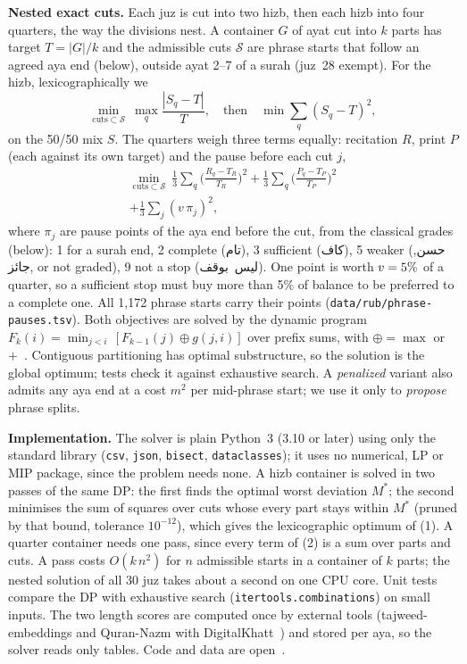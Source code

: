 \documentclass[conference]{IEEEtran}
\newcommand{\ar}[1]{\mbox{\textarabic{#1}}}
\begin{document}
\textbf{Nested exact cuts.} Each juz is cut into two hizb, then each hizb into four quarters, the
way the divisions nest. A container $G$ of ayat cut into $k$ parts has target $T=|G|/k$ and the
admissible cuts $\mathcal{S}$ are phrase starts that follow an agreed aya end (below), outside ayat 2--7 of a surah (juz~28 exempt). For the hizb, lexicographically we
\begin{equation}
\min_{\text{cuts}\subset\mathcal{S}}\ \max_q \frac{|S_q - T|}{T},\quad\text{then}\quad
\min \sum_q (S_q-T)^2 ,
\end{equation}
on the 50/50 mix $S$. The quarters weigh three terms equally: recitation $R$, print $P$ (each
against its own target) and the pause before each cut $j$,
\begin{multline}
\min_{\text{cuts}\subset\mathcal{S}}\ \tfrac13\sum_q\Big(\frac{R_q-T_R}{T_R}\Big)^{\!2}
+\tfrac13\sum_q\Big(\frac{P_q-T_P}{T_P}\Big)^{\!2}\\
+\tfrac13\sum_j (v\,\pi_j)^2 ,
\end{multline}
where $\pi_j$ are pause points of the aya end before the cut, from the classical grades
(below): 1 for a surah end, 2 complete (\ar{تام}), 3 sufficient (\ar{كاف}), 5 weaker (\ar{حسن}, \ar{جائز}, or
not graded), 9 not a stop (\ar{ليس بوقف}). One point is worth $v=5\%$ of a quarter, so a
sufficient stop must buy more than 5\% of balance to be preferred to a complete one. All 1{,}172
phrase starts carry their points (\texttt{data/rub/phrase-pauses.tsv}). Both objectives are solved
by the dynamic program $F_k(i)=\min_{j<i}\,[F_{k-1}(j)\oplus g(j,i)]$ over prefix sums,
with $\oplus=\max$ or $+$~\cite{bellman}. Contiguous partitioning has optimal substructure, so the
solution is the global optimum; tests check it against exhaustive search. A \emph{penalized}
variant also admits any aya end at a cost $m^2$ per mid-phrase start; we use it only to
\emph{propose} phrase splits.

\textbf{Implementation.} The solver is plain Python~3 (3.10 or later) using only the standard
library (\texttt{csv}, \texttt{json}, \texttt{bisect}, \texttt{dataclasses}); it uses no numerical,
LP or MIP package, since the problem needs none. A hizb container is solved in two passes of the same
DP: the first finds the optimal worst deviation $M^\ast$; the second minimises the sum of squares
over cuts whose every part stays within $M^\ast$ (pruned by that bound, tolerance $10^{-12}$),
which gives the lexicographic optimum of (1). A quarter container needs one pass, since every
term of (2) is a sum over parts and cuts. A pass costs $O(k\,n^2)$ for $n$ admissible starts
in a container of $k$ parts; the nested solution of all 30 juz takes about a second on one CPU
core. Unit tests compare the DP with exhaustive search (\texttt{itertools.combinations}) on small
inputs. The two length scores are computed once by external tools (tajweed-embeddings and
Quran-Nazm with DigitalKhatt~\cite{tajemb,nazm,digitalkhatt}) and stored per aya, so the solver
reads only tables. Code and data are open~\cite{repo}.
\end{document}
